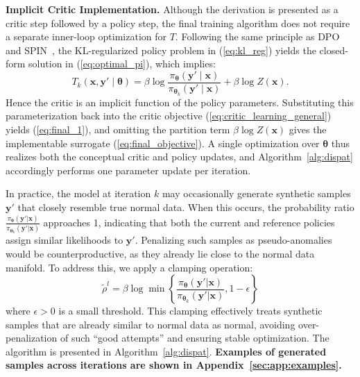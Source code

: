 \noindent\textbf{Implicit Critic Implementation.} Although the derivation is presented as a critic step followed by a policy step, the final training algorithm does not require a separate inner-loop optimization for $T$. Following the same principle as DPO~\citep{rafailov2024directpreferenceoptimizationlanguage} and SPIN~\citep{chen2024self}, the KL-regularized policy problem in (\ref{eq:kl_reg}) yields the closed-form solution in (\ref{eq:optimal_pi}), which implies:
\begin{equation*}
T_k(\boldsymbol{x},\boldsymbol{y}'\mid\boldsymbol{\theta})=\beta\log\frac{\pi_{\boldsymbol{\theta}}(\boldsymbol{y}'\mid \boldsymbol{x})}{\pi_{\boldsymbol{\theta}_{k}}(\boldsymbol{y}'\mid \boldsymbol{x})}+\beta \log Z(\boldsymbol{x}).
\end{equation*}
Hence the critic is an implicit function of the policy parameters. Substituting this parameterization back into the critic objective (\ref{eq:critic_learning_general}) yields (\ref{eq:final_1}), and omitting the partition term $\beta\log Z(\boldsymbol{x})$ gives the implementable surrogate (\ref{eq:final_objective}). A single optimization over $\boldsymbol{\theta}$ thus realizes both the conceptual critic and policy updates, and Algorithm~\ref{alg:dispat} accordingly performs one parameter update per iteration.

In practice, the model at iteration $k$ may occasionally generate synthetic samples $\boldsymbol{y}'$ that closely resemble true normal data. When this occurs, the probability ratio $\frac{\pi_{\boldsymbol{\theta}}(\boldsymbol{y}'|\boldsymbol{x})}{\pi_{\boldsymbol{\theta}_k}(\boldsymbol{y}'|\boldsymbol{x})}$ approaches 1, indicating that both the current and reference policies assign similar likelihoods to $\boldsymbol{y}'$. Penalizing such samples as pseudo-anomalies would be counterproductive, as they already lie close to the normal data manifold. To address this, we apply a clamping operation:
\begin{equation}
\label{eq:clamping}
\tilde{\rho}^l = \beta \log \min\left\{\frac{\pi_{\boldsymbol{\theta}}(\boldsymbol{y}'|\boldsymbol{x})}{\pi_{\boldsymbol{\theta}_k}(\boldsymbol{y}'|\boldsymbol{x})}, 1 - \epsilon\right\}
\end{equation}
where $\epsilon > 0$ is a small threshold. This clamping effectively treats synthetic samples that are already similar to normal data as normal, avoiding over-penalization of such ``good attempts'' and ensuring stable optimization. The algorithm is presented in Algorithm~\ref{alg:dispat}. \textbf{Examples of generated samples across iterations are shown in Appendix~\ref{sec:app:examples}.}


